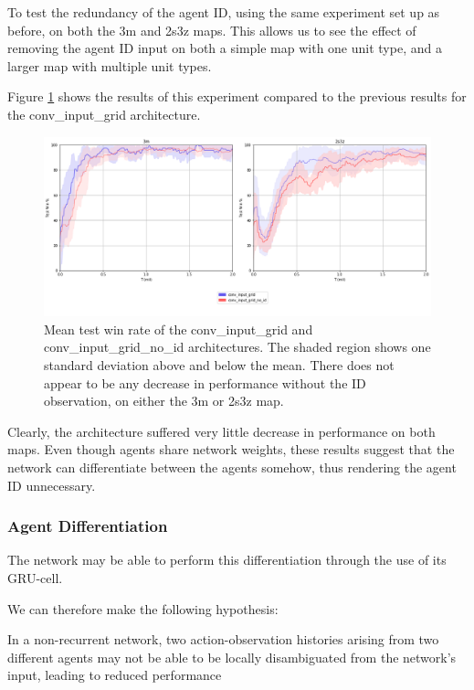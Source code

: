 To test the redundancy of the agent ID, using the same experiment set up as before, on both the 3m and 2s3z maps. This allows us to see the effect of removing the agent ID input on both a simple map with one unit type, and a larger map with multiple unit types.

Figure \ref{fig:noid} shows the results of this experiment compared to the previous results for the conv\_input\_grid architecture.

\begin{figure}
    \centering
    \hbox{\hspace{-6.6em}\includegraphics[scale=0.47]{images/graphs/noid.png}}
    \caption{Mean test win rate of the conv\_input\_grid and conv\_input\_grid\_no\_id architectures. The shaded region shows one standard deviation above and below the mean. There does not appear to be any decrease in performance without the ID observation, on either the 3m or 2s3z map.}
    \label{fig:noid}
\end{figure}


Clearly, the architecture suffered very little decrease in performance on both maps. Even though agents share network weights, these results suggest that the network can differentiate between the agents somehow, thus rendering the agent ID unnecessary. 


\subsubsection{Agent Differentiation}

The network may be able to perform this differentiation through the use of its GRU-cell.

We can therefore make the following hypothesis:

\begin{hyp} \label{hyp:second}
In a non-recurrent network, two action-observation histories arising from two different agents may not be able to be locally disambiguated from the network's input, leading to reduced performance
\end{hyp}


